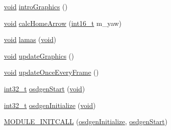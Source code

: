 \begin{DoxyCompactItemize}
\item 
\hyperlink{group___n_a_m_e_ga18028b8badbf1ea7e704ccac3c488e82}{void} \hyperlink{group___o_s_d_g_e_n_module_gadb49e780d11eb6b7ca55b1a555b55d21}{intro\-Graphics} ()
\item 
\hyperlink{group___n_a_m_e_ga18028b8badbf1ea7e704ccac3c488e82}{void} \hyperlink{group___o_s_d_g_e_n_module_ga00457c3ec2ca140e964b76b872c7b57f}{calc\-Home\-Arrow} (\hyperlink{stdint_8h_aa343fa3b3d06292b959ffdd4c4703b06}{int16\-\_\-t} m\-\_\-yaw)
\item 
\hyperlink{group___n_a_m_e_ga18028b8badbf1ea7e704ccac3c488e82}{void} \hyperlink{group___o_s_d_g_e_n_module_ga78f00a89c30b0c4c25cb300a153efe54}{lamas} (\hyperlink{group___n_a_m_e_ga18028b8badbf1ea7e704ccac3c488e82}{void})
\item 
\hyperlink{group___n_a_m_e_ga18028b8badbf1ea7e704ccac3c488e82}{void} \hyperlink{group___o_s_d_g_e_n_module_ga2a784a5e5cba20bd454de8c32e2dcfde}{update\-Graphics} ()
\item 
\hyperlink{group___n_a_m_e_ga18028b8badbf1ea7e704ccac3c488e82}{void} \hyperlink{group___o_s_d_g_e_n_module_ga368bd7bc79f8c2f6999dee52aabd7b19}{update\-Once\-Every\-Frame} ()
\item 
\hyperlink{group___n_a_m_e_gafd12020da5a235dfcf0c3c748fb5baed}{int32\-\_\-t} \hyperlink{group___o_s_d_g_e_n_module_gab4a7ade39ef421b0eb737497084c6c89}{osdgen\-Start} (\hyperlink{group___n_a_m_e_ga18028b8badbf1ea7e704ccac3c488e82}{void})
\item 
\hyperlink{group___n_a_m_e_gafd12020da5a235dfcf0c3c748fb5baed}{int32\-\_\-t} \hyperlink{group___o_s_d_g_e_n_module_gad5c99924576b5d8a3922949f6bc6643c}{osdgen\-Initialize} (\hyperlink{group___n_a_m_e_ga18028b8badbf1ea7e704ccac3c488e82}{void})
\item 
\hyperlink{group___o_s_d_g_e_n_module_gabf1debb6845824a756c3194f8367323a}{M\-O\-D\-U\-L\-E\-\_\-\-I\-N\-I\-T\-C\-A\-L\-L} (\hyperlink{group___o_s_d_g_e_n_module_gad5c99924576b5d8a3922949f6bc6643c}{osdgen\-Initialize}, \hyperlink{group___o_s_d_g_e_n_module_gab4a7ade39ef421b0eb737497084c6c89}{osdgen\-Start})
\end{DoxyCompactItemize}
